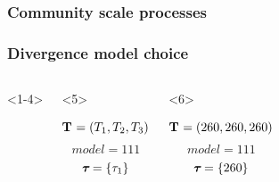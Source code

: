 \begin{frame}
    \frametitle<1-4>{Community scale processes}
    \frametitle<5->{Divergence model choice}
    \begin{columns}[c]
        \begin{onlyenv}<1-4>
            \begin{minipage}[c][0.5\textheight][c]{\linewidth}
            \end{minipage}
        \end{onlyenv}
        \begin{onlyenv}<5>
            \begin{minipage}[c][0.5\textheight][c]{\linewidth}
                \begin{displaybox}[0.95\linewidth]
                    \begin{minipage}[c][0.45\textheight][c]{0.95\linewidth}
                        \[
                            \mathbf{T_{}} = (T_{1},T_{2},T_{3})
                        \]\vspace{0mm}
                        \[
                            model = 111
                        \]\vspace{0mm}
                        \[
                            \boldsymbol{\tau_{}} = \{\tau_{1}\}
                        \]\vspace{0mm}
                    \end{minipage}
                \end{displaybox}
            \end{minipage}
        \end{onlyenv}
        \begin{onlyenv}<6>
            \begin{minipage}[c][0.5\textheight][c]{\linewidth}
                \begin{displaybox}[0.95\linewidth]
                    \begin{minipage}[c][0.45\textheight][c]{0.95\linewidth}
                        \[
                            \mathbf{T_{}} = (260,260,260)
                        \]\vspace{0mm}
                        \[
                            model = 111
                        \]\vspace{0mm}
                        \[
                            \boldsymbol{\tau_{}} = \{260\}
                        \]\vspace{0mm}
                    \end{minipage}

\end{displaybox}
\end{minipage}
\end{onlyenv}
\end{columns}
\end{frame}
